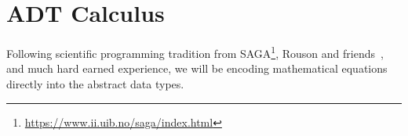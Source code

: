 \section{ADT Calculus}

Following scientific programming tradition from SAGA\footnote{\url{https://www.ii.uib.no/saga/index.html}},
Rouson and friends~\cite{rouson2011scientific,rouson2008grid}, and much
hard earned experience, we will be encoding mathematical equations
directly into the abstract data types.

